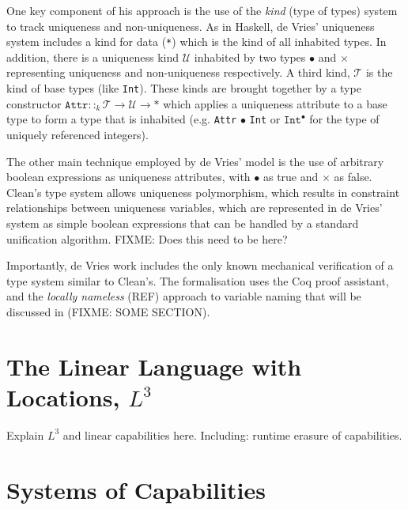 \documentclass[]{unswthesis}
\begin{document}
One key component of his approach is the use of the \textit{kind} (type of types) system to track uniqueness and non-uniqueness. As in Haskell, de Vries' uniqueness system includes a kind for data (\texttt{*}) which is the kind of all inhabited types. In addition, there is a uniqueness kind $\mathcal{U}$ inhabited by two types $\bullet$ and $\times$ representing uniqueness and non-uniqueness respectively. A third kind, $\mathcal{T}$ is the kind of base types (like \texttt{Int}). These kinds are brought together by a type constructor $\texttt{Attr} ::_k \mathcal{T} \rightarrow \mathcal{U} \rightarrow *$ which applies a uniqueness attribute to a base type to form a type that is inhabited (e.g. \texttt{Attr} $\bullet$ \texttt{Int} or $\texttt{Int}^\bullet$ for the type of uniquely referenced integers).

The other main technique employed by de Vries' model is the use of arbitrary boolean expressions as uniqueness attributes, with $\bullet$ as true and $\times$ as false. Clean's type system allows uniqueness polymorphism, which results in constraint relationships between uniqueness variables, which are represented in de Vries' system as simple boolean expressions that can be handled by a standard unification algorithm. FIXME: Does this need to be here?

Importantly, de Vries work includes the only known mechanical verification of a type system similar to Clean's. The formalisation uses the Coq proof assistant, and the \textit{locally nameless} (REF) approach to variable naming that will be discussed in (FIXME: SOME SECTION).




\section{The Linear Language with Locations, $L^3$}

Explain $L^3$ and linear capabilities here. Including: runtime erasure of capabilities.

\pagebreak

\section{Systems of Capabilities}
\end{document}
